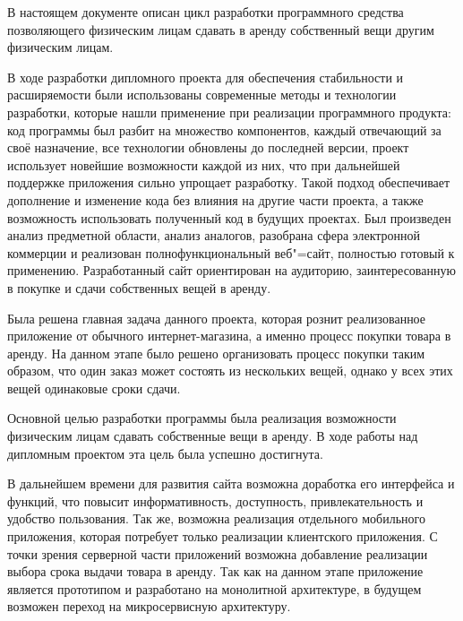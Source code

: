 
В настоящем документе описан цикл разработки программного средства позволяющего физическим лицам сдавать в аренду собственный вещи другим физическим лицам.

В ходе разработки дипломного проекта для обеспечения стабильности и расширяемости были использованы современные методы и технологии разработки, которые нашли
применение при реализации программного продукта: код программы был разбит на множество компонентов, каждый отвечающий за своё назначение, все технологии обновлены до последней версии, проект использует новейшие
возможности каждой из них, что при дальнейшей поддержке приложения сильно упрощает разработку.
Такой подход обеспечивает дополнение и изменение кода без влияния на другие части проекта, а также возможность использовать полученный код в будущих проектах.
Был произведен анализ предметной области, анализ аналогов, разобрана сфера электронной коммерции и реализован полнофункциональный веб"=сайт, полностью готовый к применению.
Разработанный сайт ориентирован на аудиторию, заинтересованную в покупке и сдачи собственных вещей в аренду.

Была решена главная задача данного проекта, которая рознит реализованное приложение от обычного интернет-магазина, а именно процесс покупки товара в аренду.
На данном этапе было решено организовать процесс покупки таким образом, что один заказ может состоять из нескольких вещей, однако у всех этих вещей одинаковые сроки сдачи.


Основной целью разработки программы была реализация возможности физическим лицам сдавать собственные вещи в аренду.
В ходе работы над дипломным проектом эта цель была успешно достигнута.

В дальнейшем времени для развития сайта возможна доработка его интерфейса и функций, что повысит информативность, доступность, привлекательность и удобство пользования.
Так же, возможна реализация отдельного мобильного приложения, которая потребует только реализации клиентского приложения.
С точки зрения серверной части приложений возможна добавление реализации выбора срока выдачи товара в аренду.
Так как на данном этапе приложение является прототипом и разработано на монолитной архитектуре, в будущем возможен переход на микросервисную архитектуру.
